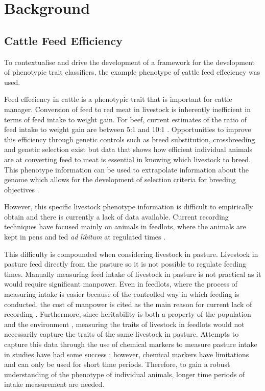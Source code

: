 \chapter{Background}

\section{Cattle Feed Efficiency}
To contextualise and drive the development of a framework for the development of phenotypic trait classifiers, the example phenotype of cattle feed effeciency was used. 

Feed effeciency in cattle is a phenotypic trait that is important for cattle manager. Conversion of feed to red meat in livestock is inherently inefficient in terms of feed intake to weight gain. For beef, current estimates of the ratio of feed intake to weight gain are between 5:1 and 10:1 \cite{Garnett2009}. Opportunities to improve this efficiency through genetic controls such as breed substitution, crossbreeding and genetic selection exist \cite{Hill2012} but data that shows how efficient individual animals are at converting feed to meat is essential in knowing which livestock to breed. This phenotype information can be used to extrapolate information about the genome which allows for the development of selection criteria for breeding objectives \cite{Pollak2012}.  

However, this specific livestock phenotype information is difficult to empirically obtain and there is currently a lack of data available. Current recording techniques have focused mainly on animals in feedlots, where the animals are kept in pens and fed \textit{ad libitum} at regulated times \cite{Arthur2005} \cite{Arthur}.

This difficulty is compounded when considering livestock in pasture. Livestock in pasture feed directly from the pasture so it is not possible to regulate feeding times. Manually measuring feed intake of livestock in pasture is not practical as it would require significant manpower. Even in feedlots, where the process of measuring intake is easier because of the controlled way in which feeding is conducted, the cost of manpower is cited as the main reason for current lack of recording \cite{Barwick2010}. Furthermore, since heritability is both a property of the population and the environment \cite{Falconer1996}, measuring the traits of livestock in feedlots would not necessarily capture the traits of the same livestock in pasture. Attempts to capture this data through the use of chemical  markers to measure pasture intake in studies have had some success \cite{Barlow2009} \cite{Dove2006}; however, chemical markers have limitations and can only be used for short time periods. Therefore, to gain a robust understanding of the phenotype of individual animals, longer time periods of intake measurement are needed.

